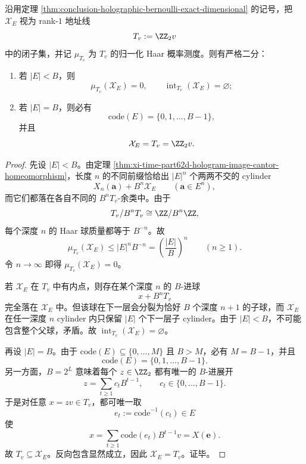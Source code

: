 \begin{corollary}\label{cor:conclusion-holographic-haar-interior-dichotomy}
沿用定理 \ref{thm:conclusion-holographic-bernoulli-exact-dimensional} 的记号，把 \(\mathcal X_E\) 视为 rank-\(1\) 地址线
\[
T_v:=\ZZ_2 v
\]
中的闭子集，并记 \(\mu_{T_v}\) 为 \(T_v\) 的归一化 Haar 概率测度。则有严格二分：
\begin{enumerate}
  \item 若 \(|E|<B\)，则
  \[
  \mu_{T_v}(\mathcal X_E)=0,
  \qquad
  \operatorname{int}_{T_v}(\mathcal X_E)=\varnothing;
  \]
  \item 若 \(|E|=B\)，则必有
  \[
  \mathrm{code}(E)=\{0,1,\dots,B-1\},
  \]
  并且
  \[
  \mathcal X_E=T_v=\ZZ_2v.
  \]
\end{enumerate}
\end{corollary}
\begin{proof}
先设 \(|E|<B\)。由定理 \ref{thm:xi-time-part62d-hologram-image-cantor-homeomorphism}，长度 \(n\) 的不同前缀恰给出 \(|E|^n\) 个两两不交的 cylinder
\[
X_n(\mathbf a)+B^n\mathcal X_E
\qquad (\mathbf a\in E^n),
\]
而它们都落在各自不同的 \(B^nT_v\)-余类中。由于
\[
T_v/B^nT_v\cong \ZZ/ B^n\ZZ,
\]
每个深度 \(n\) 的 Haar 球质量都等于 \(B^{-n}\)。故
\[
\mu_{T_v}(\mathcal X_E)
\le
|E|^n B^{-n}
=
\left(\frac{|E|}{B}\right)^n
\qquad (n\ge 1).
\]
令 \(n\to\infty\) 即得 \(\mu_{T_v}(\mathcal X_E)=0\)。

若 \(\mathcal X_E\) 在 \(T_v\) 中有内点，则存在某个深度 \(n\) 的 \(B\)-进球
\[
x+B^nT_v
\]
完全落在 \(\mathcal X_E\) 中。但该球在下一层会分裂为恰好 \(B\) 个深度 \(n+1\) 的子球，而 \(\mathcal X_E\) 在任一深度 \(n\) cylinder 内只保留 \(|E|\) 个下一层子 cylinder。由于 \(|E|<B\)，不可能包含整个父球，矛盾。故 \(\operatorname{int}_{T_v}(\mathcal X_E)=\varnothing\)。

再设 \(|E|=B\)。由于 \(\mathrm{code}(E)\subseteq\{0,\dots,M\}\) 且 \(B>M\)，必有 \(M=B-1\)，并且
\[
\mathrm{code}(E)=\{0,1,\dots,B-1\}.
\]
另一方面，\(B=2^L\) 意味着每个 \(z\in \ZZ_2\) 都有唯一的 \(B\)-进展开
\[
z=\sum_{t\ge 1}c_t B^{t-1},
\qquad
c_t\in\{0,\dots,B-1\}.
\]
于是对任意 \(x=zv\in T_v\)，都可唯一取
\[
e_t:=\mathrm{code}^{-1}(c_t)\in E
\]
使
\[
x=\sum_{t\ge 1}\mathrm{code}(e_t)B^{t-1}v=X(\mathbf e).
\]
故 \(T_v\subseteq \mathcal X_E\)。反向包含显然成立，因此 \(\mathcal X_E=T_v\)。证毕。
\end{proof}

